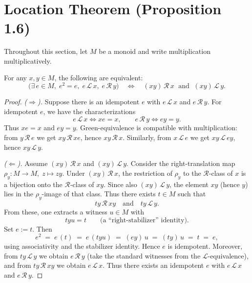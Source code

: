 
\section{Location Theorem (Proposition 1.6)}

Throughout this section, let \(M\) be a monoid and write multiplication multiplicatively.  

\begin{proposition}
\label{prop:location}
For any \(x,y\in M\), the following are equivalent:
\[
\bigl(\exists\, e\in M,\; e^2=e,\; e \,\mathcal L\, x,\; e \,\mathcal R\, y\bigr)
\quad\Longleftrightarrow\quad
(xy) \,\mathcal R\, x \;\text{ and }\; (xy) \,\mathcal L\, y.
\]
\end{proposition}

\begin{proof}
\emph{(\(\Rightarrow\)).} Suppose there is an idempotent \(e\) with \(e \,\mathcal L\, x\) and \(e \,\mathcal R\, y\).
For idempotent \(e\), we have the characterizations
\[
\textstyle e \,\mathcal L\, x \iff x e = x, \qquad e \,\mathcal R\, y \iff e y = y.
\]
Thus \(x e = x\) and \(e y = y\).  
Green-equivalence is compatible with multiplication: from \(y \,\mathcal R\, e\) we get \(x y \,\mathcal R\, x e\), hence \(x y \,\mathcal R\, x\).  
Similarly, from \(x \,\mathcal L\, e\) we get \(x y \,\mathcal L\, e y\), hence \(x y \,\mathcal L\, y\).

\smallskip
\emph{(\(\Leftarrow\)).} Assume \((xy)\,\mathcal R\, x\) and \((xy)\,\mathcal L\, y\).
Consider the right-translation map \(\rho_y\colon M\to M,\; z\mapsto z y\).
Under \((xy)\,\mathcal R\,x\), the restriction of \(\rho_y\) to the \(\mathcal R\)-class of \(x\) is a bijection onto the \(\mathcal R\)-class of \(xy\).
Since also \((xy)\,\mathcal L\, y\), the element \(xy\) (hence \(y\)) lies in the \(\rho_y\)-image of that class.  
Thus there exists \(t\in M\) such that
\[
t y \,\mathcal R\, x y
\quad\text{and}\quad
t y \,\mathcal L\, y.
\]
From these, one extracts a witness \(u\in M\) with
\[
t y u = t \qquad\text{(a ``right-stabilizer'' identity).}
\]
Set \(e := t\). Then
\[
e^2
\;=\; e\,(t)
\;=\; e\,(t y u)
\;=\; (e y)\,u
\;=\; (t y)\,u
\;=\; t
\;=\; e,
\]
using associativity and the stabilizer identity. Hence \(e\) is idempotent.  
Moreover, from \(t y \,\mathcal L\, y\) we obtain \(e \,\mathcal R\, y\) (take the standard witnesses from the \(\mathcal L\)-equivalence), and from \(t y \,\mathcal R\, x y\) we obtain \(e \,\mathcal L\, x\). Thus there exists an idempotent \(e\) with \(e \,\mathcal L\, x\) and \(e \,\mathcal R\, y\).
\end{proof}

